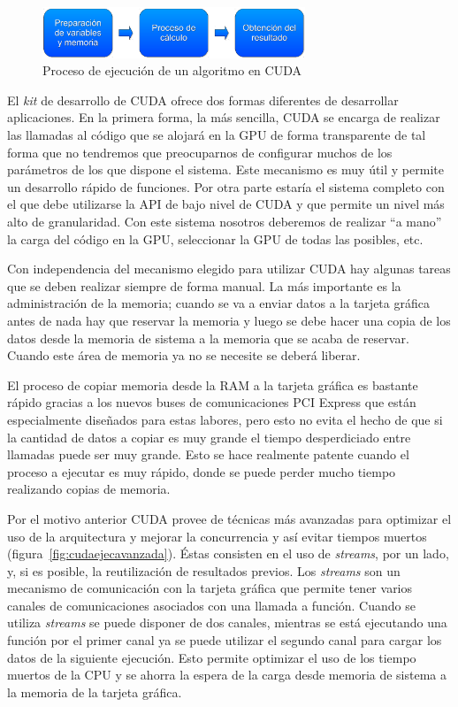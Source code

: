 \begin{figure}
	\centering
	\includegraphics[width=0.7\textwidth]{images/proc_ejec1.pdf}
	\caption{Proceso de ejecución de un algoritmo en CUDA}\label{fig:procejecuda}
\end{figure}

El \emph{kit} de desarrollo de CUDA ofrece dos formas diferentes de desarrollar aplicaciones. En la primera forma, la más sencilla, CUDA se encarga de realizar las llamadas al código que se alojará en la GPU de forma transparente de tal forma que no tendremos que preocuparnos de configurar muchos de los parámetros de los que dispone el sistema. Este mecanismo es muy útil y permite un desarrollo rápido de funciones. Por otra parte estaría el sistema completo con el que debe utilizarse la API de bajo nivel de CUDA y que permite un nivel más alto de granularidad. Con este sistema nosotros deberemos de realizar ``a mano'' la carga del código en la GPU, seleccionar la GPU de todas las posibles, etc.

Con independencia del mecanismo elegido para utilizar CUDA hay algunas tareas que se deben realizar siempre de forma manual. La más importante es la administración de la memoria; cuando se va a enviar datos a la tarjeta gráfica antes de nada hay que reservar la memoria y luego se debe hacer una copia de los datos desde la memoria de sistema a la memoria que se acaba de reservar. Cuando este área de memoria ya no se necesite se deberá liberar.

El proceso de copiar memoria desde la RAM a la tarjeta gráfica es bastante rápido gracias a los nuevos buses de comunicaciones PCI Express que están especialmente diseñados para estas labores, pero esto no evita el hecho de que si la cantidad de datos a copiar es muy grande el tiempo desperdiciado entre llamadas puede ser muy grande. Esto se hace realmente patente cuando el proceso a ejecutar es muy rápido, donde se puede perder mucho tiempo realizando copias de memoria.

Por el motivo anterior CUDA provee de técnicas más avanzadas para optimizar el uso de la arquitectura y mejorar la concurrencia y así evitar tiempos muertos (figura~\ref{fig:cudaejecavanzada}). Éstas consisten en el uso de \emph{streams}, por un lado, y, si es posible, la reutilización de resultados previos. Los \emph{streams} son un mecanismo de comunicación con la tarjeta gráfica que permite tener varios canales de comunicaciones asociados con una llamada a función. Cuando se utiliza \emph{streams} se puede disponer de dos canales, mientras se está ejecutando una función por el primer canal ya se puede utilizar el segundo canal para cargar los datos de la siguiente ejecución. Esto permite optimizar el uso de los tiempo muertos de la CPU y se ahorra la espera de la carga desde memoria de sistema a la memoria de la tarjeta gráfica.

